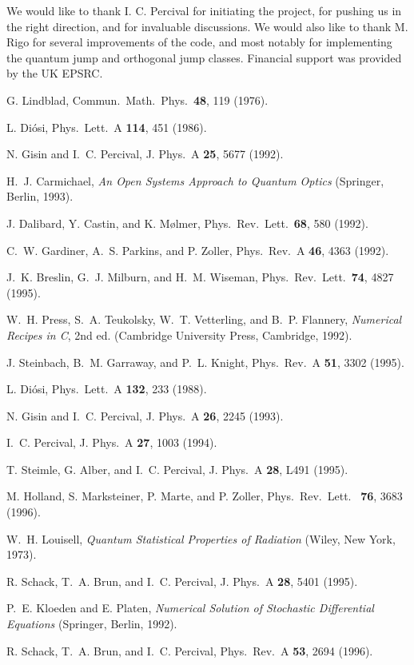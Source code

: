 We would like to thank I. C. Percival for initiating the project, for 
pushing us in the right direction, and for invaluable discussions. We
would also like to thank M. Rigo for several improvements of the code,
and most notably for implementing the quantum jump and orthogonal jump
classes. Financial support was provided by the UK EPSRC. 

%
%

\begin{thebibliography}{10}

G. Lindblad, Commun.\ Math.\ Phys.\ {\bf 48},  119  (1976).

L. Di\'osi, Phys.\ Lett.\ A {\bf 114},  451  (1986).

N. Gisin and I.~C. Percival, J. Phys.\ A {\bf 25},  5677  (1992).

H.~J. Carmichael, {\em An Open Systems Approach to Quantum Optics} (Springer,
  Berlin, 1993).

J. Dalibard, Y. Castin, and K. M{\o}lmer, Phys.\ Rev.\ Lett.\ {\bf 68},  580
  (1992).

C.~W. Gardiner, A.~S. Parkins, and P. Zoller, Phys.\ Rev.\ A {\bf 46},  4363
  (1992).

J.~K. Breslin, G.~J. Milburn, and H.~M. Wiseman, Phys.\ Rev.\ Lett.\ {\bf 74},
  4827  (1995).

W.~H. Press, S.~A. Teukolsky, W.~T. Vetterling, and B.~P. Flannery, {\em
  Numerical Recipes in C}, 2nd ed. (Cambridge University Press, Cambridge,
  1992).

J. Steinbach, B.~M. Garraway, and P.~L. Knight, Phys.\ Rev.\ A {\bf 51},  3302
  (1995).

L. Di\'osi, Phys.\ Lett.\ A {\bf 132},  233  (1988).

N. Gisin and I.~C. Percival, J. Phys.\ A {\bf 26},  2245  (1993).

I.~C. Percival, J. Phys.\ A {\bf 27},  1003  (1994).

T. Steimle, G. Alber, and I.~C. Percival, J. Phys.\ A {\bf 28},  L491  (1995).

M. Holland, S. Marksteiner, P. Marte, and P. Zoller, Phys.\ Rev.\ Lett.\ {\bf
  76},  3683  (1996).

W.~H. Louisell, {\em Quantum Statistical Properties of Radiation} (Wiley, New
  York, 1973).

R. Schack, T.~A. Brun, and I.~C. Percival, J. Phys.\ A {\bf 28},  5401  (1995).

P.~E. Kloeden and E. Platen, {\em Numerical Solution of Stochastic Differential
  Equations} (Springer, Berlin, 1992).

R. Schack, T.~A. Brun, and I.~C. Percival, Phys.\ Rev.\ A {\bf 53},  2694
  (1996).

\end{thebibliography}

